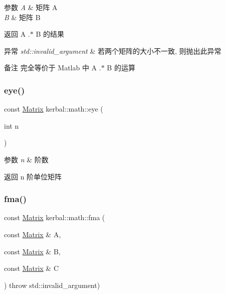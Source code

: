 \begin{DoxyParams}{参数}
{\em A} & 矩阵 A \\
\hline
{\em B} & 矩阵 B \\
\hline
\end{DoxyParams}
\begin{DoxyReturn}{返回}
A .$\ast$ B 的结果 
\end{DoxyReturn}

\begin{DoxyExceptions}{异常}
{\em std\+::invalid\+\_\+argument} & 若两个矩阵的大小不一致, 则抛出此异常 \\
\hline
\end{DoxyExceptions}
\begin{DoxyRemark}{备注}
完全等价于 Matlab 中 A .$\ast$ B 的运算 
\end{DoxyRemark}
\mbox{\label{namespacekerbal_1_1math_af4a1ae2b857e2633dcf7b1485796d90c}} 
\subsubsection{\texorpdfstring{eye()}{eye()}}
{\footnotesize\ttfamily const \hyperlink{classkerbal_1_1math_1_1_matrix}{Matrix} kerbal\+::math\+::eye (\begin{DoxyParamCaption}\item[{int}]{n }\end{DoxyParamCaption})}


\begin{DoxyParams}{参数}
{\em n} & 阶数 \\
\hline
\end{DoxyParams}
\begin{DoxyReturn}{返回}
n 阶单位矩阵 
\end{DoxyReturn}
\mbox{\label{namespacekerbal_1_1math_a278eb71f14e9ac59a15b408a4f2ff5bf}} 
\subsubsection{\texorpdfstring{fma()}{fma()}}
{\footnotesize\ttfamily const \hyperlink{classkerbal_1_1math_1_1_matrix}{Matrix} kerbal\+::math\+::fma (\begin{DoxyParamCaption}\item[{const \hyperlink{classkerbal_1_1math_1_1_matrix}{Matrix} \&}]{A,  }\item[{const \hyperlink{classkerbal_1_1math_1_1_matrix}{Matrix} \&}]{B,  }\item[{const \hyperlink{classkerbal_1_1math_1_1_matrix}{Matrix} \&}]{C }\end{DoxyParamCaption}) throw  std\+::invalid\+\_\+argument) }


